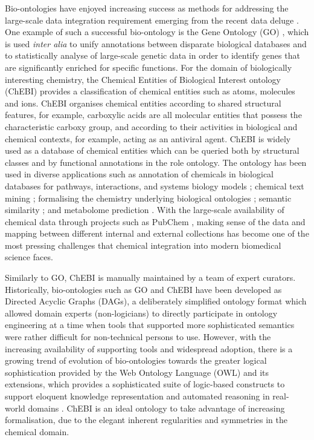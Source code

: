 \documentclass[10pt]{bmc_article}
\newenvironment{bmcformat}{\baselineskip20pt\sloppy\setboolean{publ}{false}}{\baselineskip20pt\sloppy}
\begin{document}
\begin{bmcformat}
Bio-ontologies have enjoyed increasing success as methods for addressing the large-scale data integration requirement emerging from the recent data deluge \cite{Harland2011940}. One example of such a successful bio-ontology is the Gene Ontology (GO) \cite{go2000}, which is used \textit{inter alia} to unify annotations between disparate biological databases and to statistically analyse of large-scale genetic data in order to identify genes that are significantly enriched for specific functions.  For the domain of biologically interesting chemistry, the Chemical Entities of Biological Interest ontology (ChEBI) \cite{chebi2010} provides a classification of chemical entities such as atoms, molecules and ions.  ChEBI organises chemical entities according to shared structural features, for example, carboxylic acids are all molecular entities that possess the characteristic carboxy group, and according to their activities in biological and chemical contexts, for example, acting as an antiviral agent. ChEBI is widely used as a database of chemical entities which can be queried both by structural classes and by functional annotations in the role ontology. The ontology has been used in diverse applications such as annotation of chemicals in biological databases for pathways, interactions, and systems biology models \cite{matthews2009,libiomodels2010,kerrien2007}; chemical text mining \cite{corbett2006}; formalising the chemistry underlying biological ontologies \cite{mungall2010}; semantic similarity \cite{couto2010}; and metabolome prediction \cite{swainston2010}. With the large-scale availability of chemical data through projects such as PubChem \cite{bolton2008}, making sense of the data and mapping between different internal and external collections has become one of the most pressing challenges that chemical integration into modern biomedical science faces. 

Similarly to GO, ChEBI is manually maintained by a team of expert curators.  Historically, bio-ontologies such as GO and ChEBI have been developed as Directed Acyclic Graphs (DAGs), a deliberately simplified ontology format which allowed domain experts (non-logicians) to directly participate in ontology engineering at a time when tools that supported more sophisticated semantics were rather difficult for non-technical persons to use. However, with the increasing availability of supporting tools and widespread adoption, there is a growing trend of evolution of bio-ontologies towards the greater logical sophistication provided by the Web Ontology Language (OWL) \cite{OWL2NextStep} and its extensions, which provides a sophisticated suite of logic-based constructs to support eloquent knowledge representation and automated reasoning in real-world domains \cite{alterovitz2010}.  ChEBI is an ideal ontology to take advantage of increasing formalisation, due to the elegant inherent regularities and symmetries in the chemical domain.  


\end{bmcformat}
\end{document}
